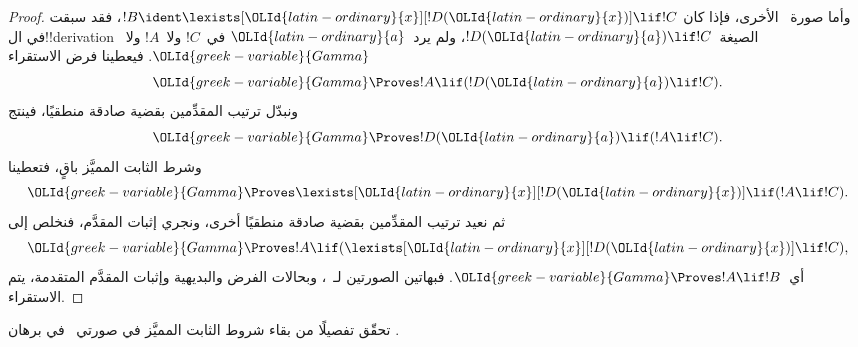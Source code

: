\documentclass[../../../include/open-logic-section]{subfiles}
\begin{document}
\begin{proof}
وأما صورة~\QR{} الأخرى، فإذا كان
$!B \ident \lexists[{\OLId{latin-ordinary}{x}}][!D({\OLId{latin-ordinary}{x}})] \lif !C$، فقد سبقت في ال!!{derivation}
الصيغة~$!D({\OLId{latin-ordinary}{a}}) \lif !C$، ولم يرد~${\OLId{latin-ordinary}{a}}$ في~$!C$ ولا~$!A$ ولا~${\OLId{greek-variable}{Gamma}}$.
فيعطينا فرض الاستقراء
\[
  {\OLId{greek-variable}{Gamma}} \Proves !A \lif (!D({\OLId{latin-ordinary}{a}}) \lif !C).
\]
ونبدّل ترتيب المقدِّمين بقضية صادقة منطقيًا، فينتج
\[
  {\OLId{greek-variable}{Gamma}} \Proves !D({\OLId{latin-ordinary}{a}}) \lif (!A \lif !C).
\]
وشرط الثابت المميَّز باقٍ، فتعطينا~\QR{}
\[
  {\OLId{greek-variable}{Gamma}} \Proves \lexists[{\OLId{latin-ordinary}{x}}][!D({\OLId{latin-ordinary}{x}})] \lif (!A \lif !C).
\]
ثم نعيد ترتيب المقدِّمين بقضية صادقة منطقيًا أخرى، ونجري إثبات المقدَّم،
فنخلص إلى
\[
  {\OLId{greek-variable}{Gamma}} \Proves !A \lif (\lexists[{\OLId{latin-ordinary}{x}}][!D({\OLId{latin-ordinary}{x}})] \lif !C),
\]
أي~${\OLId{greek-variable}{Gamma}} \Proves !A \lif !B$. فبهاتين الصورتين لـ~\QR{}، وبحالات
الفرض والبديهية وإثبات المقدَّم المتقدمة، يتم الاستقراء.
\end{proof}

\begin{prob}
  تحقّق تفصيلًا من بقاء شروط الثابت المميَّز في صورتي~\QR{} في برهان
  .
\end{prob}
\end{document}
